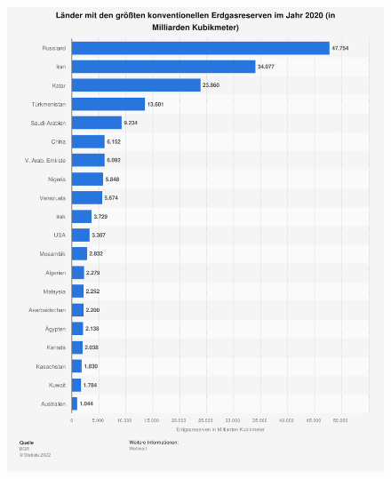 \documentclass[10pt]{beamer}
\begin{document}
\begin{frame}
\begin{figure}
\includegraphics[height=0.8\textheight]{fig/erdgasreserven.png}

\scriptsize{}
\end{figure}
\end{frame}
\end{document}

